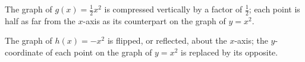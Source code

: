 \documentclass[10pt,]{book}
\theoremstyle{plain}
\theoremstyle{definition}
\theoremstyle{definition}
\theoremstyle{definition}
\theoremstyle{definition}
\theoremstyle{definition}
\numberwithin{equation}{section}
\newcommand{\hrulethin}  {\noalign{\hrule height 0.04em}}
\newcommand{\hrulethick} {\noalign{\hrule height 0.11em}}
\newcounter{figstack}
\newcounter{figindex}
\newlength\fight
\newcommand\pushValignCaptionBottom[5][b]{%
\stepcounter{figstack}%
\expandafter\def\csname %
figalign\romannumeral\value{figstack}\endcsname{#1}%
\expandafter\def\csname %
figtype\romannumeral\value{figstack}\endcsname{#2}%
\expandafter\def\csname %
figwd\romannumeral\value{figstack}\endcsname{#3}%
\expandafter\def\csname %
figcontent\romannumeral\value{figstack}\endcsname{#4}%
\expandafter\def\csname %
figcap\romannumeral\value{figstack}\endcsname{#5}%
\setbox0=\hbox{%
\begin{#2}{#3}#4\end{#2}}%
\ifdim\dimexpr\ht0+\dp0\relax>\fight\global\setlength{\fight}{%
\dimexpr\ht0+\dp0\relax}\fi%
}
\newcommand\popValignCaptionBottom{%
\setcounter{figindex}{0}%
\hfill%
\whiledo{\value{figindex}<\value{figstack}}{%
\stepcounter{figindex}%
\def\tmp{\csname figwd\romannumeral\value{figindex}\endcsname}%
\begin{\csname figtype\romannumeral\value{figindex}\endcsname}[t]{\tmp}%
\centering%
\stackinset{c}{}%
{\csname figalign\romannumeral\value{figindex}\endcsname}{}%
{\csname figcontent\romannumeral\value{figindex}\endcsname}%
{\rule{0pt}{\fight}}\par%
\csname figcap\romannumeral\value{figindex}\endcsname%
\end{\csname figtype\romannumeral\value{figindex}\endcsname}%
\hfill%
}%
\setcounter{figstack}{0}%
\setlength{\fight}{0pt}%
\hfill%
}
\begin{document}
    The graph of \(g(x) = \frac{1}{2}x^2\) is compressed vertically by a factor of \(\frac{1}{2}\); each point is half as far from the \(x\)-axis as its counterpart on the graph of \(y = x^2\).
%
\leavevmode%
\par

    The graph of \(h(x) = −x^2\) is flipped, or reflected, about the \(x\)-axis; the \(y\)-coordinate of each point on the graph of \(y = x^2\) is replaced by its opposite.
%
\par
\end{document}
